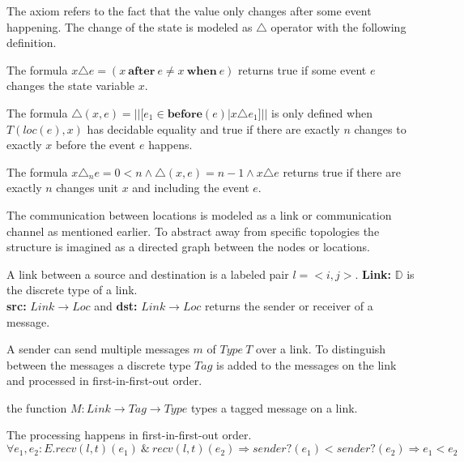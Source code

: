 The axiom refers to the fact that the value only changes after some event
happening. The change of the state is modeled as $\triangle$ operator with the
following definition.~\cite{bickford2005causal}

\begin{defi}
  The formula $x\triangle e = (x\ \textbf{after}\ e\ne x\ \textbf{when}\ e)$ returns true
  if some event $e$ changes the state variable $x$.
\end{defi}

\begin{defi}
  The formula $\triangle (x,e) = ||[e_1\in \textbf{before}(e)|x\triangle e_1]||$ is only defined when
  $T(loc(e),x)$ has decidable equality and true if there are exactly $n$ changes to
  exactly $x$ before the event $e$ happens.  
\end{defi}

\begin{defi}
  The formula $x\triangle_n e = 0<n\wedge \triangle (x,e)=n-1\wedge x\triangle e$ returns true if there are
  exactly $n$ changes unit $x$ and including the event $e$.
\end{defi}

The communication between locations is modeled as a link or communication
channel as mentioned earlier. To abstract away from specific topologies the structure
is imagined as a directed graph between the nodes or locations.~\cite{bickford2005causal}

\begin{defi}
  A link between a source and destination is a labeled pair $l=<i,j>$.
  \textbf{Link:} $\mathbb{D}$ is the discrete type of a link.\\
  \textbf{src:} $Link\rightarrow Loc$ and \textbf{dst:} $Link\rightarrow Loc$ returns the sender
  or receiver of a message.
\end{defi}

A sender can send multiple messages $m$ of $Type\ T$ over a link.
To distinguish between the messages a discrete type $Tag$
is added to the messages on the link and processed in first-in-first-out order.~\cite{bickford2005causal}

\begin{defi}
  the function $M:Link\rightarrow Tag\rightarrow Type$ types a tagged message on a link.
\end{defi}

\begin{axiom}
  The processing happens in first-in-first-out order.\\
  $\forall e_1,e_2:E.recv(l,t)(e_1)\ \&\ recv(l,t)(e_2) \Rightarrow sender?(e_1)<sender?(e_2)\Rightarrow e_1<e_2$
\end{axiom}

